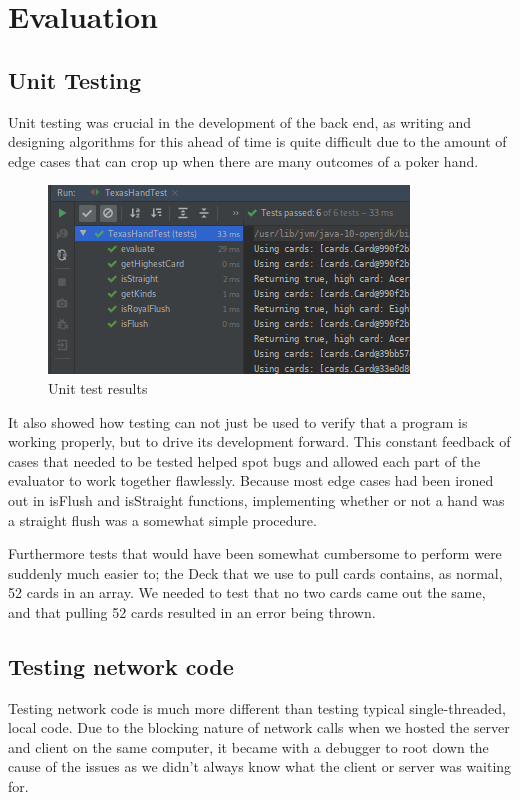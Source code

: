 \documentclass[11pt]{article}
\begin{document}
\newpage
\section{Evaluation}
\subsection{Unit Testing}
Unit testing was crucial in the development of the back end, as writing and designing algorithms for this ahead of time is quite difficult due to the amount of edge cases that can crop up when there are many outcomes of a poker hand. \\

\begin{figure}[h]
\begin{center}
	\includegraphics[width=\textwidth]{tests}
		\caption{Unit test results}
\end{center}
\end{figure}

It also showed how testing can not just be used to verify that a program is working properly, but to drive its development forward. This constant feedback of cases that needed to be tested helped spot bugs and allowed each part of the evaluator to work together flawlessly. Because most edge cases had been ironed out in isFlush and isStraight functions, implementing whether or not a hand was a straight flush was a somewhat simple procedure. 

Furthermore tests that would have been somewhat cumbersome to perform were suddenly much easier to; the Deck that we use to pull cards contains, as normal, 52 cards in an array. We needed to test that no two cards came out the same, and that pulling 52 cards resulted in an error being thrown. 

\newpage
\subsection{Testing network code}
Testing network code is much more different than testing typical single-threaded, local code. Due to the blocking nature of network calls when we hosted the server and client on the same computer, it became with a debugger to root down the cause of the issues as we didn't always know what the client or server was waiting for. \\
\end{document}
